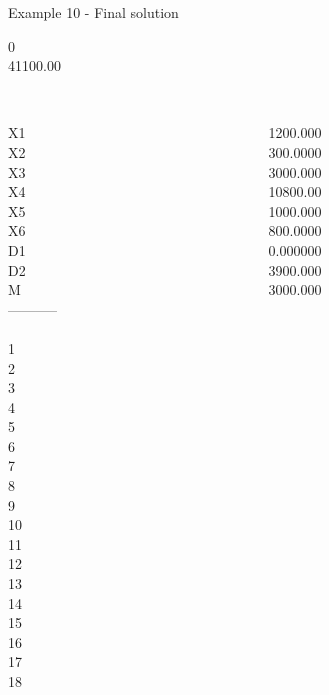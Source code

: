 \begin{frame}{Example 10 - Final solution}

  0\\
  41100.00\\

\begin{columns}[t]
\begin{column}{0.3\textwidth}
\\
X1\\
X2\\
X3\\
X4\\
X5\\
X6\\
D1\\
D2\\
M\\

-----------\\
\\
1\\
2\\
3\\
4\\
5\\
6\\
7\\
8\\
9\\
10\\
11\\
12\\
13\\
14\\
15\\
16\\
17\\
18\\

\end{column}
\begin{column}{0.3\textwidth}
\\
1200.000\\
300.0000\\
3000.000\\
10800.00\\
1000.000\\
800.0000\\
0.000000\\
3900.000\\
3000.000\\


\end{column}
\end{columns}
\end{frame}
